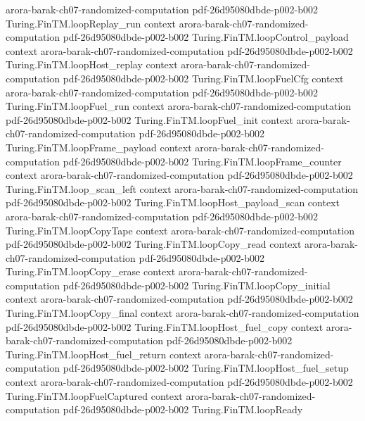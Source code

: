 \begin{theorem}
  {arora-barak-ch07-randomized-computation}
  {pdf-26d95080dbde-p002-b002}
\proofstep
  {Turing.FinTM.loopReplay_run}
  {context}
  {arora-barak-ch07-randomized-computation}
  {pdf-26d95080dbde-p002-b002}
\proofstep
  {Turing.FinTM.loopControl_payload}
  {context}
  {arora-barak-ch07-randomized-computation}
  {pdf-26d95080dbde-p002-b002}
\proofstep
  {Turing.FinTM.loopHost_replay}
  {context}
  {arora-barak-ch07-randomized-computation}
  {pdf-26d95080dbde-p002-b002}
\proofstep
  {Turing.FinTM.loopFuelCfg}
  {context}
  {arora-barak-ch07-randomized-computation}
  {pdf-26d95080dbde-p002-b002}
\proofstep
  {Turing.FinTM.loopFuel_run}
  {context}
  {arora-barak-ch07-randomized-computation}
  {pdf-26d95080dbde-p002-b002}
\proofstep
  {Turing.FinTM.loopFuel_init}
  {context}
  {arora-barak-ch07-randomized-computation}
  {pdf-26d95080dbde-p002-b002}
\proofstep
  {Turing.FinTM.loopFrame_payload}
  {context}
  {arora-barak-ch07-randomized-computation}
  {pdf-26d95080dbde-p002-b002}
\proofstep
  {Turing.FinTM.loopFrame_counter}
  {context}
  {arora-barak-ch07-randomized-computation}
  {pdf-26d95080dbde-p002-b002}
\proofstep
  {Turing.FinTM.loop_scan_left}
  {context}
  {arora-barak-ch07-randomized-computation}
  {pdf-26d95080dbde-p002-b002}
\proofstep
  {Turing.FinTM.loopHost_payload_scan}
  {context}
  {arora-barak-ch07-randomized-computation}
  {pdf-26d95080dbde-p002-b002}
\proofstep
  {Turing.FinTM.loopCopyTape}
  {context}
  {arora-barak-ch07-randomized-computation}
  {pdf-26d95080dbde-p002-b002}
\proofstep
  {Turing.FinTM.loopCopy_read}
  {context}
  {arora-barak-ch07-randomized-computation}
  {pdf-26d95080dbde-p002-b002}
\proofstep
  {Turing.FinTM.loopCopy_erase}
  {context}
  {arora-barak-ch07-randomized-computation}
  {pdf-26d95080dbde-p002-b002}
\proofstep
  {Turing.FinTM.loopCopy_initial}
  {context}
  {arora-barak-ch07-randomized-computation}
  {pdf-26d95080dbde-p002-b002}
\proofstep
  {Turing.FinTM.loopCopy_final}
  {context}
  {arora-barak-ch07-randomized-computation}
  {pdf-26d95080dbde-p002-b002}
\proofstep
  {Turing.FinTM.loopHost_fuel_copy}
  {context}
  {arora-barak-ch07-randomized-computation}
  {pdf-26d95080dbde-p002-b002}
\proofstep
  {Turing.FinTM.loopHost_fuel_return}
  {context}
  {arora-barak-ch07-randomized-computation}
  {pdf-26d95080dbde-p002-b002}
\proofstep
  {Turing.FinTM.loopHost_fuel_setup}
  {context}
  {arora-barak-ch07-randomized-computation}
  {pdf-26d95080dbde-p002-b002}
\proofstep
  {Turing.FinTM.loopFuelCaptured}
  {context}
  {arora-barak-ch07-randomized-computation}
  {pdf-26d95080dbde-p002-b002}
\proofstep
  {Turing.FinTM.loopReady}

\end{theorem}
